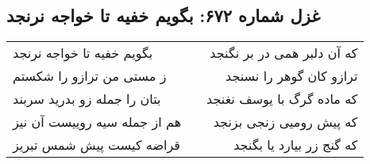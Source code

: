 \begin{center}
\section*{غزل شماره ۶۷۲: بگویم خفیه تا خواجه نرنجد}
\label{sec:0672}
\begin{longtable}{l p{0.5cm} r}
بگویم خفیه تا خواجه نرنجد
&&
که آن دلبر همی در بر نگنجد
\\
ز مستی من ترازو را شکستم
&&
ترازو کان گوهر را نسنجد
\\
بتان را جمله زو بدرید سربند
&&
که ماده گرگ با یوسف نغنجد
\\
هم از جمله سیه روییست آن نیز
&&
که پیش رومیی زنجی بزنجد
\\
قراضه کیست پیش شمس تبریز
&&
که گنج زر بیارد یا بگنجد
\\
\end{longtable}
\end{center}
